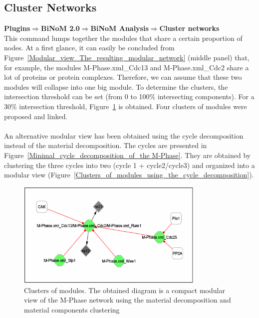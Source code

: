 \subsection{Cluster Networks}
\textbf{Plugins$\Rightarrow$BiNoM 2.0$\Rightarrow$BiNoM Analysis$\Rightarrow$Cluster networks}\\
This command lumps together the modules that share a certain proportion of nodes. At a first glance, it can easily be concluded from Figure~\ref{Modular_view_The_resulting_modular_network} (middle panel) that, for example, the modules M-Phase.xml\_Cdc13 and M-Phase.xml\_Cdc2 share a lot of proteins or protein complexes. Therefore, we can assume that these two modules will collapse into one big module. To determine the clusters, the intersection threshold can be set (from 0 to 100\% intersecting components). For a 30\% intersection threshold, Figure~\ref{Clusters_of_modules_using_the_material_decomposition} is obtained. Four clusters of modules were proposed and linked.\\\\
An alternative modular view has been obtained using the cycle decomposition instead of the material decomposition. The cycles are presented in Figure~\ref{Minimal_cycle_decomposition_of_the M-Phase}. They are obtained by clustering the three cycles into two (cycle 1 + cycle2/cycle3) and organized into a modular view (Figure~\ref{Clusters_of_modules_using_the_cycle_decomposition}).\\
\begin{figure}
\centering
\includegraphics[width=0.8\textwidth]{graphics/Clusters_of_modules_using_the_material_decomposition}
\caption{Clusters of modules. The obtained diagram is a compact modular view of the M-Phase network using the material decomposition and material components clustering}
\label{Clusters_of_modules_using_the_material_decomposition}
\end{figure}
